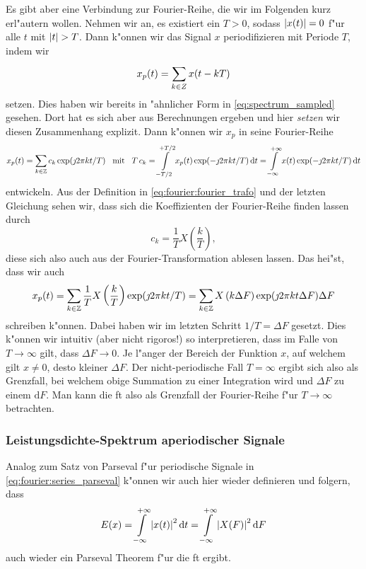 Es gibt aber eine Verbindung zur Fourier-Reihe, die wir im Folgenden kurz erl"autern wollen.
Nehmen wir an, es existiert ein $T > 0$, sodass ${\left| x(t) \right|} = 0$ f"ur alle $t$ mit ${\left| t \right|} > T$.
Dann k"onnen wir das Signal $x$ periodifizieren mit Periode $T$, indem wir
\[
x_p(t) = {\sum\limits_{k \in Z}^{}{x(t - kT)}}
\]
setzen.
Dies haben wir bereits in "ahnlicher Form in \eqref{eq:spectrum_sampled} gesehen. 
Dort hat es sich aber aus Berechnungen ergeben und hier \emph{setzen} wir diesen Zusammenhang explizit.
Dann k"onnen wir $x_p$ in seine Fourier-Reihe 
\[
x_p(t) = {\sum\limits_{k \in \mathbb{Z}}^{}{c_k \exp(\jmath 2 \pi k t/T)}}
{\hspace{3mm} \text{mit} \hspace{3mm}}
T\,c_k = {\int\limits_{-T/2}^{+T/2}{x_p(t) \exp(- \jmath 2 \pi k t/T)}\,\mathrm{d}{t}}
    = {\int\limits_{-\infty}^{+\infty}{x(t) \exp(- \jmath 2 \pi k t/T)}\,\mathrm{d}{t}}
\]
entwickeln.
Aus der Definition in \eqref{eq:fourier:fourier_trafo} und der letzten Gleichung sehen wir, dass sich die Koeffizienten der Fourier-Reihe finden lassen durch
\begin{equation}\label{eq:fourier:c_k_fourier}
    c_k = \frac 1T X\left(\frac kT\right),
\end{equation}
diese sich also auch aus der Fourier-Transformation ablesen lassen.
Das hei"st, dass wir auch
\[
x_p(t) = {\sum\limits_{k \in \mathbb{Z}}^{}{\frac 1T X\left(\frac kT\right) \exp(\jmath 2 \pi k t/T)}}
       = {\sum\limits_{k \in \mathbb{Z}}^{}{X\left(k \Delta F\right) \exp(\jmath 2 \pi k t \Delta F) \Delta F}}
\]
schreiben k"onnen.
Dabei haben wir im letzten Schritt $1/T = \Delta F$ gesetzt.
Dies k"onnen wir intuitiv (aber nicht rigoros!) so interpretieren, dass im Falle von $T \rightarrow \infty$ gilt, dass $\Delta F \rightarrow 0$.
Je l"anger der Bereich der Funktion $x$, auf welchem gilt $x \neq 0$, desto kleiner $\Delta F$.
Der nicht-periodische Fall $T = \infty$ ergibt sich also als Grenzfall, bei welchem obige Summation zu einer Integration wird und $\Delta F$ zu einem $\mathrm{d}F$.
Man kann die \acrlong{ft} also als Grenzfall der Fourier-Reihe f"ur $T \rightarrow \infty$ betrachten.
%
%
\subsubsection{Leistungsdichte-Spektrum aperiodischer Signale}
%
Analog zum Satz von Parseval f"ur periodische Signale in \eqref{eq:fourier:series_parseval} k"onnen wir auch hier wieder definieren und folgern, dass
\begin{equation}
E(x) = {\int\limits_{-\infty}^{+\infty}{{\left| x(t) \right|}^2}\,\mathrm{d}{t}}
     = {\int\limits_{-\infty}^{+\infty}{{\left| X(F) \right|}^2}\,\mathrm{d}{F}}
\end{equation}
auch wieder ein Parseval Theorem f"ur die \acrlong{ft} ergibt.

